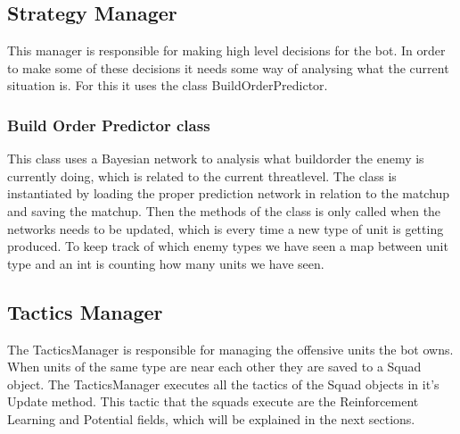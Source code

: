 	\subsection{Strategy Manager}
		This manager is responsible for making high level decisions for the bot. In order to make some of these decisions it needs some way of 
		analysing what the current situation is. For this it uses the class BuildOrderPredictor.
		\subsubsection{Build Order Predictor class}
			This class uses a Bayesian network to analysis what buildorder the enemy is currently doing, which is related to the current threatlevel. 
			The class is instantiated by loading the proper prediction network in relation to the matchup and saving the matchup. Then the methods of the 
			class is only called when the networks needs to be updated, which is every time a new type of unit is getting produced. To keep track of which 
			enemy types we have seen a map between unit type and an int is counting how many units we have seen. 
	\subsection{Tactics Manager}
		The TacticsManager is responsible for managing the offensive units the bot owns. When units of the same type are near each other they are saved 
		to a Squad object. The TacticsManager executes all the tactics of the Squad objects in it's Update method. This tactic that the squads execute 
		are the Reinforcement Learning and Potential fields, which will be explained in the next sections.
		
			
		
			
			
				
			
		